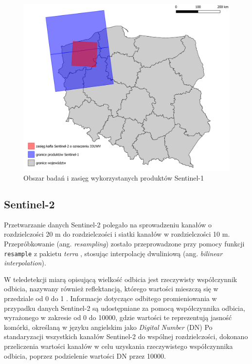 \documentclass{amuthesis}
\begin{document}
\begin{figure}[t]

{\centering \includegraphics[width=1\textwidth,height=\textheight]{figures/sen1_extents.png}

}

\caption{\label{fig-rycina-s1-extents}Obszar badań i zasięg
wykorzystanych produktów Sentinel-1}

\end{figure}

\hypertarget{sec-processing-s2}{%
\subsection{Sentinel-2}\label{sec-processing-s2}}

Przetwarzanie danych Sentinel-2 polegało na sprowadzeniu kanałów o
rozdzielczości 20 m do rozdzielczości i siatki kanałów w rozdzielczości
10 m. Przepróbkowanie (ang. \emph{resampling}) zostało przeprowadzone
przy pomocy funkcji \texttt{resample} z pakietu \emph{terra}
\autocite{R-terra}, stosując interpolację dwuliniową (ang.
\emph{bilinear interpolation}).

W teledetekcji miarą opisującą wielkość odbicia jest rzeczywisty
współczynnik odbicia, nazywany również reflektancją, którego wartości
mieszczą się w przedziale od 0 do 1 \autocite{hejmanowska_2020_dane}.
Informacje dotyczące odbitego promieniowania w przypadku danych
Sentinel-2 są udostępniane za pomocą współczynnika odbicia, wyrażonego w
zakresie od 0 do 10000, gdzie wartości te reprezentują jasność komórki,
określaną w języku angielskim jako \emph{Digital Number} (DN) Po
standaryzacji wszystkich kanałów Sentinel-2 do wspólnej rozdzielczości,
dokonano przeliczenia wartości kanałów w celu uzyskania rzeczywistego
współczynnika odbicia, poprzez podzielenie wartości DN przez 10000.
\end{document}
